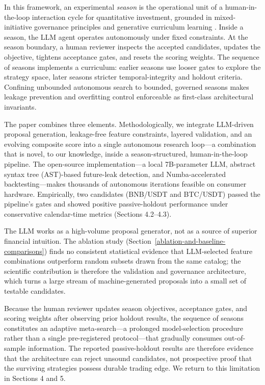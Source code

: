 \documentclass[analytics,article,submit,pdftex,moreauthors]{Definitions/mdpi}
\begin{document}
In this framework, an experimental \emph{season} is the operational unit of a human-in-the-loop interaction cycle for quantitative investment, grounded in mixed-initiative governance principles \citep{horvitz_1999, amershi_2019} and generative curriculum learning \citep{bengio_2009}. Inside a season, the LLM agent operates autonomously under fixed constraints. At the season boundary, a human reviewer inspects the accepted candidates, updates the objective, tightens acceptance gates, and resets the scoring weights. The sequence of seasons implements a curriculum: earlier seasons use looser gates to explore the strategy space, later seasons stricter temporal-integrity and holdout criteria. Confining unbounded autonomous search to bounded, governed seasons makes leakage prevention and overfitting control enforceable as first-class architectural invariants.

The paper combines three elements. Methodologically, we integrate LLM-driven proposal generation, leakage-free feature constraints, layered validation, and an evolving composite score into a single autonomous research loop---a combination that is novel, to our knowledge, inside a season-structured, human-in-the-loop pipeline. The open-source implementation---a local 7B-parameter LLM, abstract syntax tree (AST)-based future-leak detection, and Numba-accelerated backtesting---makes thousands of autonomous iterations feasible on consumer hardware. Empirically, two candidates (BNB/USDT and BTC/USDT) passed the pipeline's gates and showed positive passive-holdout performance under conservative calendar-time metrics (Sections 4.2--4.3).

The LLM works as a high-volume proposal generator, not as a source of superior financial intuition. The ablation study (Section~\ref{ablation-and-baseline-comparisons}) finds no consistent statistical evidence that LLM-selected feature combinations outperform random subsets drawn from the same catalog; the scientific contribution is therefore the validation and governance architecture, which turns a large stream of machine-generated proposals into a small set of testable candidates.

Because the human reviewer updates season objectives, acceptance gates, and scoring weights after observing prior holdout results, the sequence of seasons constitutes an adaptive meta-search---a prolonged model-selection procedure rather than a single pre-registered protocol---that gradually consumes out-of-sample information. The reported passive-holdout results are therefore evidence that the architecture can reject unsound candidates, not prospective proof that the surviving strategies possess durable trading edge. We return to this limitation in Sections 4 and 5.
\end{document}
